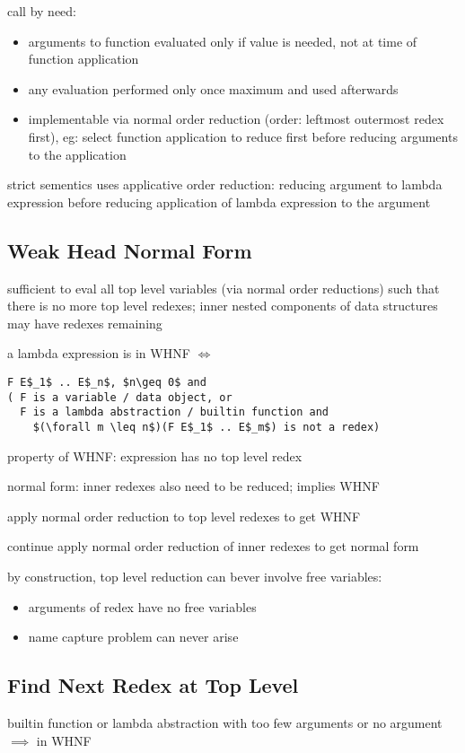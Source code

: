 \documentclass[8pt]{extarticle}
\begin{document}
\begin{multicols*}{2}
call by need:
\begin{itemize}
\item arguments to function evaluated only if value is needed, not at time of function application
\item any evaluation performed only once maximum and used afterwards
\item implementable via normal order reduction (order: leftmost outermost redex first), eg: select function application to reduce first before reducing arguments to the application
\end{itemize}

strict sementics uses applicative order reduction: reducing argument to lambda expression before reducing application of lambda expression to the argument

\subsection{Weak Head Normal Form}

sufficient to eval all top level variables (via normal order reductions) such that there is no more top level redexes; inner nested components of data structures may have redexes remaining

a lambda expression is in WHNF $\iff$
\begin{lstlisting}
F E$_1$ .. E$_n$, $n\geq 0$ and
( F is a variable / data object, or
  F is a lambda abstraction / builtin function and
    $(\forall m \leq n$)(F E$_1$ .. E$_m$) is not a redex)
\end{lstlisting}

property of WHNF: expression has no top level redex

normal form: inner redexes also need to be reduced; implies WHNF

apply normal order reduction to top level redexes to get WHNF

continue apply normal order reduction of inner redexes to get normal form

by construction, top level reduction can bever involve free variables:
\begin{itemize}
\item arguments of redex have no free variables
\item name capture problem can never arise
\end{itemize}

\subsection{Find Next Redex at Top Level}
builtin function or lambda abstraction with too few arguments or no argument $\implies$ in WHNF


\end{multicols*}
\end{document}
